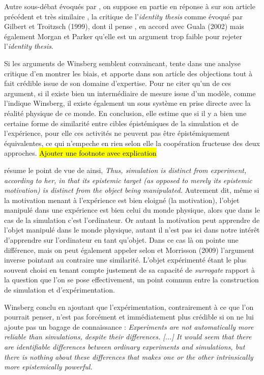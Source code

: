 Autre sous-débat évoqués par \textcite{Winsberg2013}, on suppose en partie en réponse à sur son article précédent et très similaire \autocite{Winsberg2009}, la critique de l'\textit{identity thesis} comme évoqué par Gilbert et Troitzsch (1999), dont il pense , en accord avec Guala (2002) \autocite{Winsberg2009} mais également Morgan et Parker \autocite{Winsberg2013} qu'elle est un argument trop faible pour rejeter l'\textit{identity thesis}.  

Si les arguments de Winsberg semblent convaincant, \textcites{Peschard2010b, Peschard2013} tente dans une analyse critique d'en montrer les biais, et apporte dans son article des objections tout à fait crédible issue de son domaine d'expertise. Pour ne citer qu'un de ces argument, si il existe bien un intermédiaire de mesure issue d'un modèle, comme l'indique Winsberg, il existe également un sous système en prise directe avec la réalité physique de ce monde. En conclusion, elle estime que si il y a bien une certaine forme de similarité entre cibles épistémiques de la simulation et de l'expérience, pour elle ces activités ne peuvent pas être épistémiquement équivalentes, ce qui n'empeche en rien selon elle la coopération fructeuse des deux approches. \hl{Ajouter une footnote avec explication}

\textcite{Winsberg2013} résume le point de vue de \autocite{Peschard2010} ainsi, \textit{Thus, simulation is distinct from experiment, according to her, in that its epistemic target (as opposed to merely its epistemic motivation) is distinct from the object being manipulated.} Autrement dit, même si la motivation menant à l'expérience est bien eloigné (la motivation), l'objet manipulé dans une expérience est bien celui du monde physique, alors que dans le cas de la simulation c'est l'ordinateur. Or autant la motivation peut apprendre de l'objet manipulé dans le monde physique, autant il n'est pas ici dans notre intérêt d'apprendre sur l'ordinateur en tant qu'objet. Dans ce cas là on pointe une différence, mais on peut également appeler selon \textcite{Winsberg2013} et Morrisson (2009) l'argument inverse pointant au contraire une similarité. L'objet expérimenté étant le plus souvent choisi en tenant compte justement de sa capacité de \textit{surrogate} rapport à la question que l'on se pose effectivement, un point commun entre la construction de simulation et d'expérimentation. 

Winsberg conclu en ajoutant que l'expérimentation, contrairement à ce que l'on pourrait penser, n'est pas forcément et immédiatement plus crédible si on ne lui ajoute pas un bagage de connaissance : \textit{Experiments are not automatically more reliable than simulations, despite their differences. [...] It would seem that there are identifiable differences between ordinary experiments and simulations, but there is nothing about these differences that makes one or the other intrinsically more epistemically powerful.}  \autocites{Winsberg2009, Winsberg2013}

